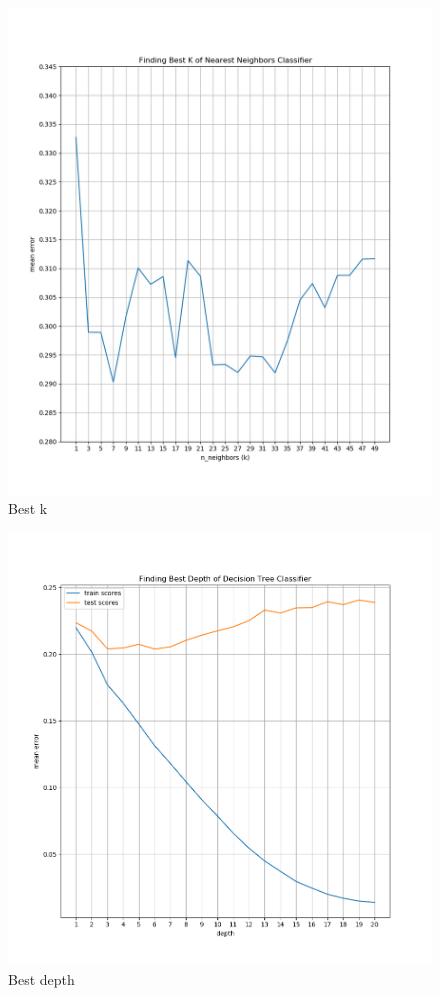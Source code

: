 \documentclass[11pt]{article}
\begin{document}
\begin{itemize}
\begin{enumerate}
        \begin{figure}
          \includegraphics[width=\textwidth]{figs/best_k_odd.png}
          \caption{Best k}
          \label{fig:bestk}
        \end{figure}

        \begin{figure}
          \includegraphics[width=\textwidth]{figs/best_depth_8020split.png}
          \caption{Best depth}
          \label{fig:bestdepth}
        \end{figure}


\end{enumerate}
\end{itemize}
\end{document}
